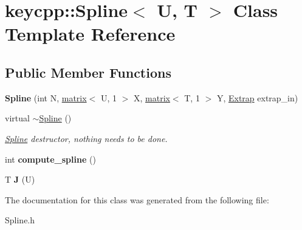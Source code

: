 \hypertarget{classkeycpp_1_1_spline}{\section{keycpp\-:\-:Spline$<$ U, T $>$ Class Template Reference}
\label{classkeycpp_1_1_spline}
}
\subsection*{Public Member Functions}
\begin{DoxyCompactItemize}
\item 
\hypertarget{classkeycpp_1_1_spline_a194cf24e01ff4ac2074bea5bc47f1610}{{\bfseries Spline} (int N, \hyperlink{classkeycpp_1_1matrix}{matrix}$<$ U, 1 $>$ X, \hyperlink{classkeycpp_1_1matrix}{matrix}$<$ T, 1 $>$ Y, \hyperlink{classkeycpp_1_1_extrap}{Extrap} extrap\-\_\-in)}\label{classkeycpp_1_1_spline_a194cf24e01ff4ac2074bea5bc47f1610}

\item 
\hypertarget{classkeycpp_1_1_spline_a8d7aaf51fd3a1c48ed43d70b2b9c10fe}{virtual \hyperlink{classkeycpp_1_1_spline_a8d7aaf51fd3a1c48ed43d70b2b9c10fe}{$\sim$\-Spline} ()}\label{classkeycpp_1_1_spline_a8d7aaf51fd3a1c48ed43d70b2b9c10fe}

\begin{DoxyCompactList}\small\item\em \hyperlink{classkeycpp_1_1_spline}{Spline} destructor, nothing needs to be done. \end{DoxyCompactList}\item 
\hypertarget{classkeycpp_1_1_spline_afcd84822df41426f4ea9da070d97b376}{int {\bfseries compute\-\_\-spline} ()}\label{classkeycpp_1_1_spline_afcd84822df41426f4ea9da070d97b376}

\item 
\hypertarget{classkeycpp_1_1_spline_a7fa452b0c1952f0a3e4160f59195d513}{T {\bfseries J} (U)}\label{classkeycpp_1_1_spline_a7fa452b0c1952f0a3e4160f59195d513}

\end{DoxyCompactItemize}


The documentation for this class was generated from the following file\-:\begin{DoxyCompactItemize}
\item 
Spline.\-h\end{DoxyCompactItemize}
